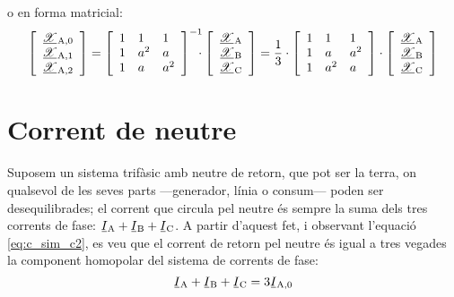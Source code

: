 o en forma matricial:
\begin{equation}\label{eq:c_sim_mat1}
   \begin{bmatrix}\begin{array}{c}
     \cmplx{\mathscr{X}}\ped{A,0} \\
     \cmplx{\mathscr{X}}\ped{A,1} \\
     \cmplx{\mathscr{X}}\ped{A,2}
    \end{array}\end{bmatrix} =
   \begin{bmatrix}\begin{array}{lll}
     1 & 1 & 1 \\
     1 & a^2 & a\\
     1 & a & a^2
   \end{array}\end{bmatrix}^{-1} \hspace{-2mm}\cdot
   \begin{bmatrix}\begin{array}{c}
     \cmplx{\mathscr{X}}\ped{A} \\
     \cmplx{\mathscr{X}}\ped{B} \\
     \cmplx{\mathscr{X}}\ped{C}
   \end{array}\end{bmatrix} =  \frac{1}{3} \cdot
   \begin{bmatrix}\begin{array}{lll}
     1 & 1 & 1 \\
     1 & a & a^2 \\
     1 & a^2 & a
   \end{array}\end{bmatrix} \cdot
   \begin{bmatrix}\begin{array}{c}
     \cmplx{\mathscr{X}}\ped{A} \\
     \cmplx{\mathscr{X}}\ped{B} \\
     \cmplx{\mathscr{X}}\ped{C}
   \end{array}\end{bmatrix}
\end{equation}

\section{Corrent de neutre}\label{sec:corrent-neutre}

Suposem un sistema trifàsic amb neutre de retorn, que pot ser la
terra, on qualsevol de les seves parts ---generador, línia o consum---
poden ser desequilibrades; el corrent que circula pel neutre és
sempre la suma dels tres corrents de fase: $\cmplx{I}\ped{A}+
\cmplx{I}\ped{B}+\cmplx{I}\ped{C}$. A partir d'aquest fet, i
observant l'equació \eqref{eq:c_sim_c2}, es veu que el corrent de
retorn pel neutre és igual a tres vegades la component homopolar
del sistema de corrents de fase:
\begin{equation}
    \cmplx{I}\ped{A}+\cmplx{I}\ped{B}+\cmplx{I}\ped{C} =3 \cmplx{I}\ped{A,0}
\end{equation}

